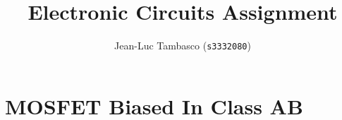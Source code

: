 \documentclass[11pt,a4paper,final]{article}
\title{Electronic Circuits Assignment}
\author{Jean-Luc Tambasco (\texttt{s3332080})}
\numberwithin{figure}{section}
\begin{document}
\maketitle

\section{MOSFET Biased In Class AB}

\begin{figure*}[htbp]
    \centering
    \caption{The animation shows the current waveform ou$  $t of one of the MOSFETs as the gate-source voltage of the MOSFET is varied sinusoidally.  We can see that the MOSFET conducts for slightly more than $\SI{\pi}{\radian}$; this is because the MOSFET is biased in class AB.}
\end{figure*}
\end{document}

